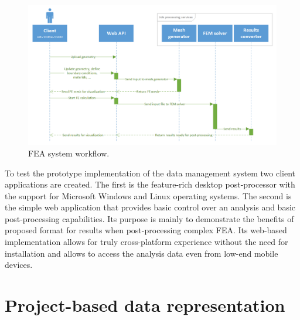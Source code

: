 \begin{figure}[H]
    \centering
    \includegraphics[width=\textwidth]{figures/FEA-workflow}
    \decoRule
    \caption{FEA system workflow.}
    \label{fig:FEA-workflow}
\end{figure}

To test the prototype implementation of the data management system two client applications are created. The first is the feature-rich desktop post-processor with the support for Microsoft Windows and Linux operating systems. The second is the simple web application that provides basic control over an analysis and basic post-processing capabilities. Its purpose is mainly to demonstrate the benefits of proposed format for results when post-processing complex FEA. Its web-based implementation allows for truly cross-platform experience without the need for installation and allows to access the analysis data even from low-end mobile devices.

\section{Project-based data representation}
\label{sec:project-data}

